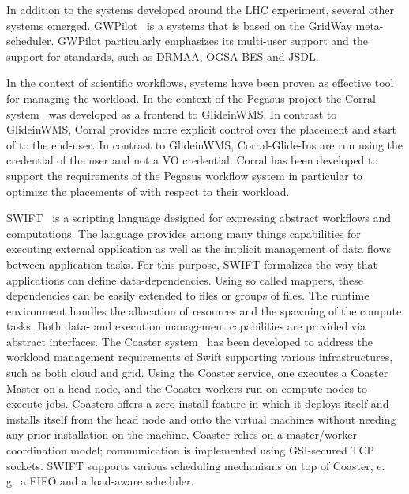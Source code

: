 \documentclass{sig-alternate}
\begin{document}
In addition to the \pilotjob systems developed around the LHC experiment,
several other systems emerged. GWPilot~\cite{gwpilot} is a \pilot systems that
is based on the GridWay meta-scheduler. GWPilot particularly emphasizes its
multi-user support and the support for standards, such as DRMAA, OGSA-BES and
JSDL.





In the context of scientific workflows, \pilotjob systems have been
proven as effective tool for managing the workload. In the context of
the Pegasus project the Corral
system~\cite{Rynge:2011:EUG:2116259.2116599} was developed as a
frontend to GlideinWMS. In contrast to GlideinWMS, Corral provides
more explicit control over the placement and start of \pilots to the
end-user. In contrast to GlideinWMS, Corral-Glide-Ins are run using
the credential of the user and not a VO credential. Corral has been
developed to support the requirements of the Pegasus workflow system
in particular to optimize the placements of \pilots with respect to
their workload.

SWIFT~\cite{Wilde2011} is a scripting language designed for expressing
abstract workflows and computations. The language provides among many
things capabilities for executing external application as well as the
implicit management of data flows between application tasks. For this
purpose, SWIFT formalizes the way that applications can define
data-dependencies. Using so called mappers, these dependencies can be
easily extended to files or groups of files. The runtime environment
handles the allocation of resources and the spawning of the compute
tasks. Both data- and execution management capabilities are provided
via abstract interfaces. The Coaster system~\cite{coasters} has been
developed to address the workload management requirements of Swift
supporting various infrastructures, such as both cloud and grid. Using
the Coaster service, one executes a Coaster Master on a head node, and
the Coaster workers run on compute nodes to execute jobs.  Coasters
offers a zero-install feature in which it deploys itself and installs
itself from the head node and onto the virtual machines  without
needing any prior installation on the machine. Coaster relies on a
master/worker coordination model; communication is implemented using
GSI-secured TCP sockets. SWIFT supports various scheduling mechanisms
on top of Coaster, e.\,g.\ a FIFO and a load-aware scheduler.
\end{document}
